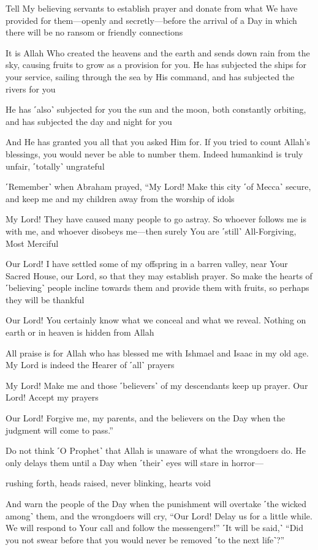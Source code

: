 Tell My believing servants to establish prayer and donate from what We have provided for them—openly and secretly—before the arrival of a Day in which there will be no ransom or friendly connections

It is Allah Who created the heavens and the earth and sends down rain from the sky, causing fruits to grow as a provision for you. He has subjected the ships for your service, sailing through the sea by His command, and has subjected the rivers for you

He has ˹also˺ subjected for you the sun and the moon, both constantly orbiting, and has subjected the day and night for you

And He has granted you all that you asked Him for. If you tried to count Allah’s blessings, you would never be able to number them. Indeed humankind is truly unfair, ˹totally˺ ungrateful

˹Remember˺ when Abraham prayed, “My Lord! Make this city ˹of Mecca˺ secure, and keep me and my children away from the worship of idols

My Lord! They have caused many people to go astray. So whoever follows me is with me, and whoever disobeys me—then surely You are ˹still˺ All-Forgiving, Most Merciful

Our Lord! I have settled some of my offspring in a barren valley, near Your Sacred House, our Lord, so that they may establish prayer. So make the hearts of ˹believing˺ people incline towards them and provide them with fruits, so perhaps they will be thankful

Our Lord! You certainly know what we conceal and what we reveal. Nothing on earth or in heaven is hidden from Allah

All praise is for Allah who has blessed me with Ishmael and Isaac in my old age. My Lord is indeed the Hearer of ˹all˺ prayers

My Lord! Make me and those ˹believers˺ of my descendants keep up prayer. Our Lord! Accept my prayers

Our Lord! Forgive me, my parents, and the believers on the Day when the judgment will come to pass.”

Do not think ˹O Prophet˺ that Allah is unaware of what the wrongdoers do. He only delays them until a Day when ˹their˺ eyes will stare in horror—

rushing forth, heads raised, never blinking, hearts void

And warn the people of the Day when the punishment will overtake ˹the wicked among˺ them, and the wrongdoers will cry, “Our Lord! Delay us for a little while. We will respond to Your call and follow the messengers!” ˹It will be said,˺ “Did you not swear before that you would never be removed ˹to the next life˺?”

